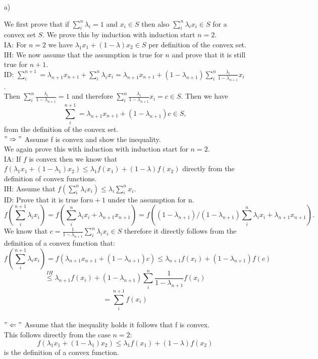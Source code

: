 \documentclass[10pt]{article}
\numberwithin{equation}{section}
\begin{document}
\begin{enumerate}
\item[a)]{
		We first prove that if $\sum_i^n \lambda_i = 1$ and $x_i \in S$ then also $\sum_i^{n}\lambda_i x_i \in S$ for a convex set $S$. 
	We prove this by induction with induction start $n=2$. \\
	IA: For $n=2$ we have $\lambda_1 x_1 + (1-\lambda) x_2 \in S$ per definition of the convex set.\\ 
	IH: We now assume that the assumption is true for $n$ and prove that it is still true for $n+1$. \\
	ID: $\sum_i^{n+1} = \lambda_{n+1} x_{n+1} + \sum_{i}^{n}\lambda_ix_i = \lambda_{n+1} x_{n+1} + (1-\lambda_{n+1})\sum_{i}^{n}\frac{\lambda_i}{1-\lambda_{n+1}}x_i$. \\Then  $\sum_{i}^{n}\frac{\lambda_i}{1-\lambda_{n+1}} = 1 $ and therefore $\sum_{i}^{n}\frac{\lambda_i}{1-\lambda_{n+1}}x_i = c  \in S$. Then we have
	$$
	\sum_i^{n+1} = \lambda_{n+1} x_{n+1} + (1- \lambda_{n+1}) c\in S,
	$$
	from the definition of the convex set. \\
	
	$"\Rightarrow"$ Assume f is convex and show the inequality.\\
	We again prove this with induction with induction start for $n=2$.\\
	IA: If $f$ is convex then we know that $f(\lambda_1 x_1 + (1- \lambda_1) x_2) \leq \lambda_1 f(x_1) + (1-\lambda) f(x_2)$ directly from the definition of convex functions. \\
	IH: Assume that $f(\sum_i^n \lambda_i x_i) \leq \lambda_i \sum_i^n x_i$. \\
	ID: Prove that it is true for$n+1$ under the assumption for n. 
	$$f(\sum_i^{n+1} \lambda_i x_i) = f(\sum_i^{n} \lambda_i x_i + \lambda_{n+1}x_{n+1}) = f((1-\lambda_{n+1}) / (1- \lambda_{n+1})\sum_i^{n} \lambda_i x_i + \lambda_{n+1}x_{n+1}).
	$$ We know that $c = \frac{1}{1- \lambda_{n+1}}\sum_i^{n} \lambda_i x_i \in S$ therefore it directly follows from the definition of a convex function that:
	$$
	f(\sum_i^{n+1} \lambda_i x_i) = f( \lambda_{n+1} x_{n+1} + (1-\lambda_{n+1})c) \leq \lambda_{n+1}f(x_i) + (1-\lambda_{n+1}) f(c)
	$$
	$$
	\overset{IH}{\leq} \lambda_{n+1}f(x_i) + (1-\lambda_{n+1}) \sum_i^n\frac{1}{1- \lambda_{n+1}}f(x_i) 
	$$
	$$
	=  \sum_i^{n+1}f(x_i)
	$$\\
	$"\Leftarrow"$ Assume that the inequality holds it follows that f is convex.\\
	This follows directly from the case $n=2$:
	$$
	f(\lambda_1 x_1 + (1- \lambda_1) x_2) \leq \lambda_1 f(x_1) + (1-\lambda)f(x_2)
	$$
	is the definition of a convex function. 

}
\end{enumerate}
\end{document}
